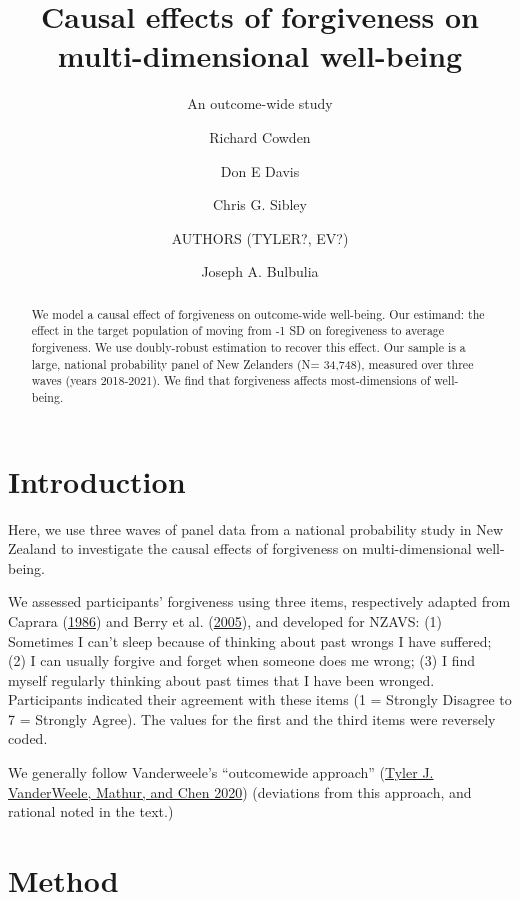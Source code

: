 \documentclass[
  singlecolumn]{report}
\title{Causal effects of forgiveness on multi-dimensional well-being}
\subtitle{An outcome-wide study}
\author{Richard Cowden \and Don E Davis \and Chris G.
Sibley \and AUTHORS (TYLER?, EV?) \and Joseph A. Bulbulia}
\date{}
\begin{document}
\maketitle
\begin{abstract}
We model a causal effect of forgiveness on outcome-wide well-being. Our
estimand: the effect in the target population of moving from -1 SD on
foregiveness to average forgiveness. We use doubly-robust estimation to
recover this effect. Our sample is a large, national probability panel
of New Zelanders (N= 34,748), measured over three waves (years
2018-2021). We find that forgiveness affects most-dimensions of
well-being.
\end{abstract}
\ifdefined\Shaded\renewenvironment{Shaded}{\begin{tcolorbox}[boxrule=0pt, breakable, borderline west={3pt}{0pt}{shadecolor}, enhanced, interior hidden, sharp corners, frame hidden]}{\end{tcolorbox}}\fi

\listoffigures
\listoftables
\hypertarget{introduction}{%
\section{Introduction}\label{introduction}}

Here, we use three waves of panel data from a national probability study
in New Zealand to investigate the causal effects of forgiveness on
multi-dimensional well-being.

We assessed participants' forgiveness using three items, respectively
adapted from Caprara
(\protect\hyperlink{ref-caprara_indicators_1986}{1986}) and Berry et al.
(\protect\hyperlink{ref-berry_forgivingness_2005}{2005}), and developed
for NZAVS: (1) Sometimes I can't sleep because of thinking about past
wrongs I have suffered; (2) I can usually forgive and forget when
someone does me wrong; (3) I find myself regularly thinking about past
times that I have been wronged. Participants indicated their agreement
with these items (1 = Strongly Disagree to 7 = Strongly Agree). The
values for the first and the third items were reversely coded.

We generally follow Vanderweele's ``outcomewide approach''
(\protect\hyperlink{ref-vanderweele2020}{Tyler J. VanderWeele, Mathur,
and Chen 2020}) (deviations from this approach, and rational noted in
the text.)

\hypertarget{method}{%
\section{Method}\label{method}}
\end{document}
